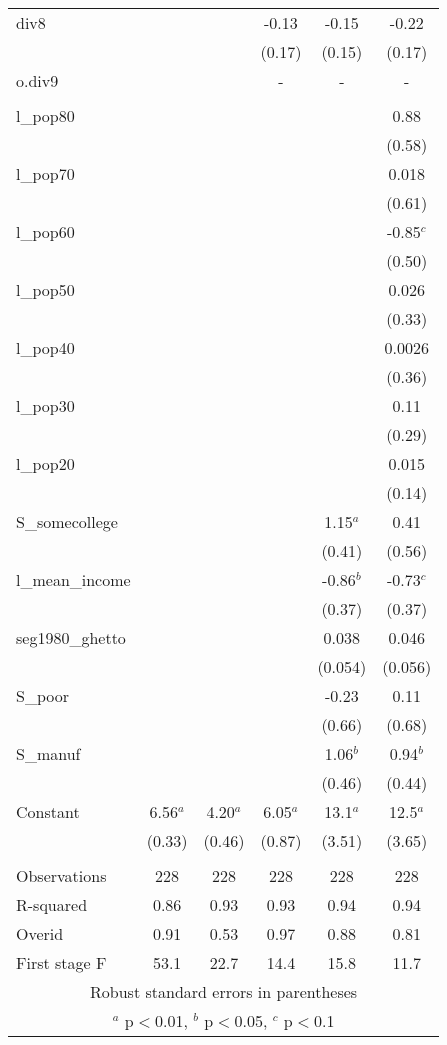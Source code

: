 \documentclass[]{article}
\begin{document}
\begin{tabular}{lccccc}
div8 &  &  & -0.13 & -0.15 & -0.22 \\
 &  &  & (0.17) & (0.15) & (0.17) \\
o.div9 &  &  & - & - & - \\
 &  &  &  &  &  \\
l\_pop80 &  &  &  &  & 0.88 \\
 &  &  &  &  & (0.58) \\
l\_pop70 &  &  &  &  & 0.018 \\
 &  &  &  &  & (0.61) \\
l\_pop60 &  &  &  &  & -0.85$^c$ \\
 &  &  &  &  & (0.50) \\
l\_pop50 &  &  &  &  & 0.026 \\
 &  &  &  &  & (0.33) \\
l\_pop40 &  &  &  &  & 0.0026 \\
 &  &  &  &  & (0.36) \\
l\_pop30 &  &  &  &  & 0.11 \\
 &  &  &  &  & (0.29) \\
l\_pop20 &  &  &  &  & 0.015 \\
 &  &  &  &  & (0.14) \\
S\_somecollege &  &  &  & 1.15$^a$ & 0.41 \\
 &  &  &  & (0.41) & (0.56) \\
l\_mean\_income &  &  &  & -0.86$^b$ & -0.73$^c$ \\
 &  &  &  & (0.37) & (0.37) \\
seg1980\_ghetto &  &  &  & 0.038 & 0.046 \\
 &  &  &  & (0.054) & (0.056) \\
S\_poor &  &  &  & -0.23 & 0.11 \\
 &  &  &  & (0.66) & (0.68) \\
S\_manuf &  &  &  & 1.06$^b$ & 0.94$^b$ \\
 &  &  &  & (0.46) & (0.44) \\
Constant & 6.56$^a$ & 4.20$^a$ & 6.05$^a$ & 13.1$^a$ & 12.5$^a$ \\
 & (0.33) & (0.46) & (0.87) & (3.51) & (3.65) \\
 &  &  &  &  &  \\
Observations & 228 & 228 & 228 & 228 & 228 \\
R-squared & 0.86 & 0.93 & 0.93 & 0.94 & 0.94 \\
Overid & 0.91 & 0.53 & 0.97 & 0.88 & 0.81 \\
 First stage F & 53.1 & 22.7 & 14.4 & 15.8 & 11.7 \\ \hline
\multicolumn{6}{c}{ Robust standard errors in parentheses} \\
\multicolumn{6}{c}{ $^a$ p$<$0.01, $^b$ p$<$0.05, $^c$ p$<$0.1} \\
\end{tabular}
\end{document}
